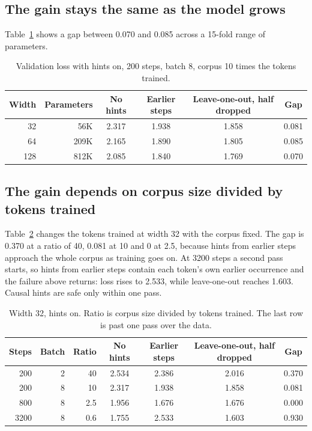 \documentclass[11pt]{article}
\begin{document}
\subsection{The gain stays the same as the model grows}
Table~\ref{tab:size} shows a gap between 0.070 and 0.085 across a 15-fold range of parameters.

\begin{table}[h]\centering
\begin{tabular}{rrcccc}\toprule
Width & Parameters & No hints & Earlier steps & Leave-one-out, half dropped & Gap\\\midrule
32 & 56K & 2.317 & 1.938 & 1.858 & 0.081\\
64 & 209K & 2.165 & 1.890 & 1.805 & 0.085\\
128 & 812K & 2.085 & 1.840 & 1.769 & 0.070\\\bottomrule
\end{tabular}
\caption{Validation loss with hints on, 200 steps, batch 8, corpus 10 times the tokens trained.}\label{tab:size}
\end{table}

\subsection{The gain depends on corpus size divided by tokens trained}
Table~\ref{tab:ratio} changes the tokens trained at width 32 with the corpus fixed. The gap is 0.370 at a ratio of 40, 0.081 at 10 and 0 at 2.5, because hints from earlier steps approach the whole corpus as training goes on. At 3200 steps a second pass starts, so hints from earlier steps contain each token's own earlier occurrence and the failure above returns: loss rises to 2.533, while leave-one-out reaches 1.603. Causal hints are safe only within one pass.

\begin{table}[h]\centering
\begin{tabular}{rrrcccc}\toprule
Steps & Batch & Ratio & No hints & Earlier steps & Leave-one-out, half dropped & Gap\\\midrule
200 & 2 & 40 & 2.534 & 2.386 & 2.016 & 0.370\\
200 & 8 & 10 & 2.317 & 1.938 & 1.858 & 0.081\\
800 & 8 & 2.5 & 1.956 & 1.676 & 1.676 & 0.000\\
3200 & 8 & 0.6 & 1.755 & 2.533 & 1.603 & 0.930\\\bottomrule
\end{tabular}
\caption{Width 32, hints on. Ratio is corpus size divided by tokens trained. The last row is past one pass over the data.}\label{tab:ratio}
\end{table}
\end{document}
